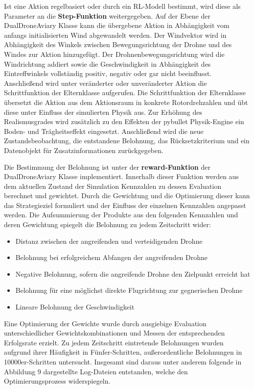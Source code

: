 Ist eine Aktion regelbasiert oder durch ein RL-Modell bestimmt, wird diese als Parameter an die \textbf{Step-Funktion} weitergegeben.
Auf der Ebene der DualDroneAviary Klasse kann die übergebene Aktion in Abhängigkeit vom anfangs initialisierten Wind abgewandelt werden.
Der Windvektor wird in Abhängigkeit des Winkels zwischen Bewegungsrichtung der Drohne und des Windes zur Aktion hinzugefügt.
Der Drohnenbewegungsrichtung wird die Windrichtung addiert sowie die Geschwindigkeit in Abhängigkeit des Eintreffwinkels vollständig positiv, negativ oder gar nicht beeinflusst.
Anschließend wird unter veränderter oder unveränderter Aktion die Schrittfunktion der Elternklasse aufgerufen.
Die Schrittfunktion der Elternklasse übersetzt die Aktion aus dem Aktionsraum in konkrete Rotordrehzahlen und übt diese unter Einfluss der simulierten Physik aus.
Zur Erhöhung des Realismusgrades wird zusätzlich zu den Effekten der pybullet Physik-Engine ein Boden- und Trägheitseffekt eingesetzt.
Anschließend wird die neue Zustandsbeobachtung, die entstandene Belohnung, das Rücksetzkriterium und ein Datenobjekt für Zusatzinformationen zurückgegeben.

Die Bestimmung der Belohnung ist unter der \textbf{reward-Funktion} der DualDroneAviary Klasse implementiert.
Innerhalb dieser Funktion werden aus dem aktuellen Zustand der Simulation Kennzahlen zu dessen Evaluation berechnet und gewichtet.
Durch die Gewichtung und die Optimierung dieser kann das Strategieziel formuliert und der Einfluss der einzelnen Kennzahlen angepasst werden.
Die Aufsummierung der Produkte aus den folgenden Kennzahlen und deren Gewichtung spiegelt die Belohnung zu jedem Zeitschritt wider:
\begin{itemize}
    \item Distanz zwischen der angreifenden und verteidigenden Drohne
    \item Belohnung bei erfolgreichem Abfangen der angreifenden Drohne
    \item Negative Belohnung, sofern die angreifende Drohne den Zielpunkt erreicht hat
    \item Belohnung für eine möglichst direkte Flugrichtung zur gegnerischen Drohne
    \item Lineare Belohnung der Geschwindigkeit
\end{itemize}
Eine Optimierung der Gewichte wurde durch ausgiebige Evaluation unterschiedlicher Gewichtskombinationen und Messen der entsprechenden Erfolgsrate erzielt.
Zu jedem Zeitschritt eintretende Belohnungen wurden aufgrund ihrer Häufigkeit in Fünfer-Schritten, außerordentliche Belohnungen in 10000er-Schritten untersucht.
Insgesamt sind daraus unter anderem folgende in Abbildung 9 dargestellte Log-Dateien entstanden, welche den Optimierungsprozess widerspiegeln.

